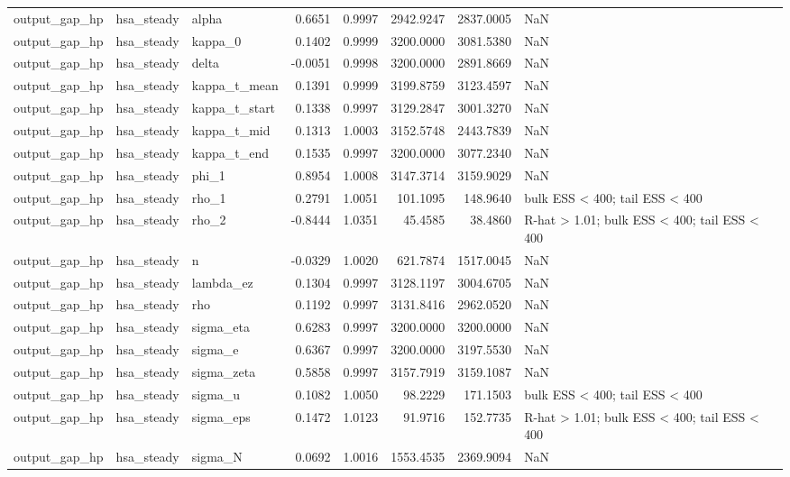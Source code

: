 \begin{tabular}{lllrrrrl}
output\_gap\_hp & hsa\_steady & alpha & 0.6651 & 0.9997 & 2942.9247 & 2837.0005 & NaN \\
output\_gap\_hp & hsa\_steady & kappa\_0 & 0.1402 & 0.9999 & 3200.0000 & 3081.5380 & NaN \\
output\_gap\_hp & hsa\_steady & delta & -0.0051 & 0.9998 & 3200.0000 & 2891.8669 & NaN \\
output\_gap\_hp & hsa\_steady & kappa\_t\_mean & 0.1391 & 0.9999 & 3199.8759 & 3123.4597 & NaN \\
output\_gap\_hp & hsa\_steady & kappa\_t\_start & 0.1338 & 0.9997 & 3129.2847 & 3001.3270 & NaN \\
output\_gap\_hp & hsa\_steady & kappa\_t\_mid & 0.1313 & 1.0003 & 3152.5748 & 2443.7839 & NaN \\
output\_gap\_hp & hsa\_steady & kappa\_t\_end & 0.1535 & 0.9997 & 3200.0000 & 3077.2340 & NaN \\
output\_gap\_hp & hsa\_steady & phi\_1 & 0.8954 & 1.0008 & 3147.3714 & 3159.9029 & NaN \\
output\_gap\_hp & hsa\_steady & rho\_1 & 0.2791 & 1.0051 & 101.1095 & 148.9640 & bulk ESS < 400; tail ESS < 400 \\
output\_gap\_hp & hsa\_steady & rho\_2 & -0.8444 & 1.0351 & 45.4585 & 38.4860 & R-hat > 1.01; bulk ESS < 400; tail ESS < 400 \\
output\_gap\_hp & hsa\_steady & n & -0.0329 & 1.0020 & 621.7874 & 1517.0045 & NaN \\
output\_gap\_hp & hsa\_steady & lambda\_ez & 0.1304 & 0.9997 & 3128.1197 & 3004.6705 & NaN \\
output\_gap\_hp & hsa\_steady & rho & 0.1192 & 0.9997 & 3131.8416 & 2962.0520 & NaN \\
output\_gap\_hp & hsa\_steady & sigma\_eta & 0.6283 & 0.9997 & 3200.0000 & 3200.0000 & NaN \\
output\_gap\_hp & hsa\_steady & sigma\_e & 0.6367 & 0.9997 & 3200.0000 & 3197.5530 & NaN \\
output\_gap\_hp & hsa\_steady & sigma\_zeta & 0.5858 & 0.9997 & 3157.7919 & 3159.1087 & NaN \\
output\_gap\_hp & hsa\_steady & sigma\_u & 0.1082 & 1.0050 & 98.2229 & 171.1503 & bulk ESS < 400; tail ESS < 400 \\
output\_gap\_hp & hsa\_steady & sigma\_eps & 0.1472 & 1.0123 & 91.9716 & 152.7735 & R-hat > 1.01; bulk ESS < 400; tail ESS < 400 \\
output\_gap\_hp & hsa\_steady & sigma\_N & 0.0692 & 1.0016 & 1553.4535 & 2369.9094 & NaN \\

\end{tabular}
